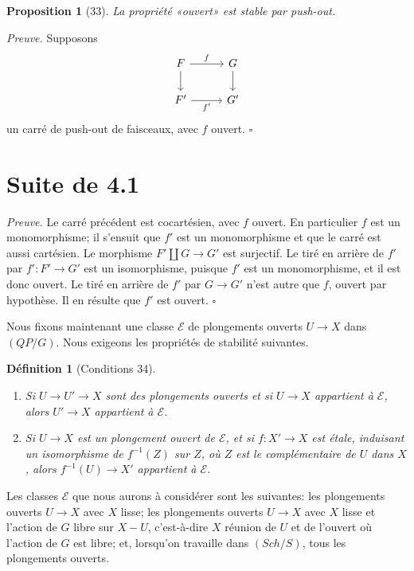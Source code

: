 \documentclass[11pt]{article}
\theoremstyle{deligne}
\newtheorem*{proposition*}{Proposition}
\newtheorem*{definition*}{Définition}
\newenvironment{proofdel}{\noindent\textit{Preuve.}}{\hfill$\square$}
\begin{document}
\begin{proposition*}[33]
La propriété «ouvert» est stable par push-out.
\end{proposition*}

\begin{proofdel}
Supposons
\[
\begin{tikzcd}[column sep=2.8em,row sep=1.8em]
F \arrow[r,"f"] \arrow[d] & G \arrow[d] \\
F' \arrow[r,"f'"'] & G'
\end{tikzcd}
\]
un carré de push-out de faisceaux, avec \(f\) ouvert.
\end{proofdel}

\section*{Suite de 4.1}

\begin{proofdel}
Le carré précédent est cocartésien, avec \(f\) ouvert. En particulier \(f\) est un monomorphisme; il s'ensuit que \(f'\) est un monomorphisme et que le carré est aussi cartésien. Le morphisme \(F'\amalg G\to G'\) est surjectif. Le tiré en arrière de \(f'\) par \(f':F'\to G'\) est un isomorphisme, puisque \(f'\) est un monomorphisme, et il est donc ouvert. Le tiré en arrière de \(f'\) par \(G\to G'\) n'est autre que \(f\), ouvert par hypothèse. Il en résulte que \(f'\) est ouvert.
\end{proofdel}

Nous fixons maintenant une classe \(\mathcal E\) de plongements ouverts \(U\to X\) dans \((QP/G)\). Nous exigeons les propriétés de stabilité suivantes.

\begin{definition*}[Conditions 34]
\begin{enumerate}[label=\arabic*.]
\item Si \(U\to U'\to X\) sont des plongements ouverts et si \(U\to X\) appartient à \(\mathcal E\), alors \(U'\to X\) appartient à \(\mathcal E\).
\item Si \(U\to X\) est un plongement ouvert de \(\mathcal E\), et si \(f:X'\to X\) est étale, induisant un isomorphisme de \(f^{-1}(Z)\) sur \(Z\), où \(Z\) est le complémentaire de \(U\) dans \(X\), alors \(f^{-1}(U)\to X'\) appartient à \(\mathcal E\).
\end{enumerate}
\end{definition*}

Les classes \(\mathcal E\) que nous aurons à considérer sont les suivantes: les plongements ouverts \(U\to X\) avec \(X\) lisse; les plongements ouverts \(U\to X\) avec \(X\) lisse et l'action de \(G\) libre sur \(X-U\), c'est-à-dire \(X\) réunion de \(U\) et de l'ouvert où l'action de \(G\) est libre; et, lorsqu'on travaille dans \((Sch/S)\), tous les plongements ouverts.
\end{document}
